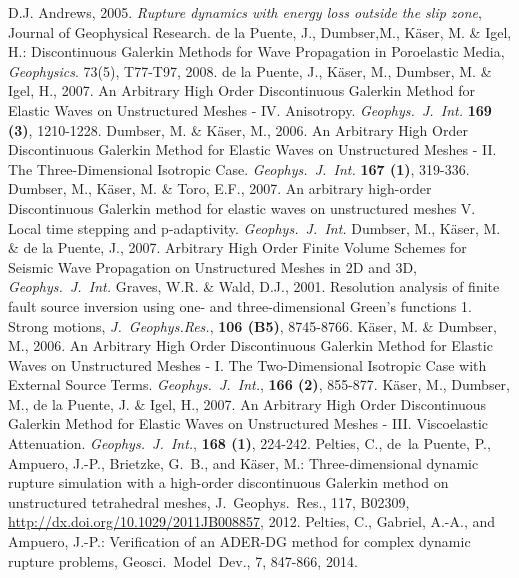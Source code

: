 \documentclass[12pt,twoside]{article}
\begin{document}
\begin{thebibliography}{99}
D.J. Andrews, 2005. \textit{Rupture dynamics with energy loss outside the slip zone}, Journal of Geophysical Research.
  de la Puente, J., Dumbser,M., K\"aser, M. \& Igel, H.: Discontinuous Galerkin Methods for Wave Propagation in Poroelastic Media, \textit{Geophysics}. 73(5), T77-T97, 2008.
  de la Puente, J., K\"aser, M., Dumbser, M. \& Igel, H., 2007. An Arbitrary High Order Discontinuous
  Galerkin Method for Elastic Waves on Unstructured Meshes - IV. Anisotropy.
  \textit{Geophys.~J.~Int.} \textbf{169 (3)}, 1210-1228.
  Dumbser, M. \& K\"aser, M., 2006. An Arbitrary High Order Discontinuous Galerkin Method for
  Elastic Waves on Unstructured Meshes - II. The Three-Dimensional Isotropic Case.
  \textit{Geophys.~J.~Int.} \textbf{167 (1)}, 319-336.
  Dumbser, M., K\"aser, M. \& Toro, E.F., 2007. An arbitrary high-order Discontinuous Galerkin method for elastic
  waves on unstructured meshes  V. Local time stepping and p-adaptivity.
  \textit{Geophys.~J.~Int.}
  Dumbser, M., K\"aser, M. \& de la Puente, J., 2007. Arbitrary High Order Finite Volume Schemes for Seismic Wave Propagation on
  Unstructured Meshes in 2D and 3D,
  \textit{Geophys.~J.~Int.}
  Graves, W.R. \& Wald, D.J., 2001. Resolution analysis of finite fault source inversion using one- and three-dimensional Green's functions    1. Strong motions,
  \textit{J.~Geophys.Res.}, \textbf{106 (B5)}, 8745-8766.
  K\"aser, M. \& Dumbser, M., 2006. An Arbitrary High Order Discontinuous Galerkin Method for
  Elastic Waves on Unstructured Meshes - I. The Two-Dimensional Isotropic Case with External Source Terms.
  \textit{Geophys.~J.~Int.}, \textbf{166 (2)}, 855-877.
  K\"aser, M., Dumbser, M., de la Puente, J. \& Igel, H., 2007. An Arbitrary High Order Discontinuous
  Galerkin Method for Elastic Waves on Unstructured Meshes - III. Viscoelastic Attenuation.
  \textit{Geophys.~J.~Int.}, \textbf{168 (1)}, 224-242.
  Pelties, C., de~la Puente, P., Ampuero, J.-P., Brietzke, G.~B., and K\"aser,
  M.: Three-dimensional dynamic rupture simulation with a high-order
  discontinuous {G}alerkin method on unstructured tetrahedral meshes,
  J.~Geophys.~Res., 117, B02309,
  \url{http://dx.doi.org/10.1029/2011JB008857}, 2012.
  Pelties, C., Gabriel, A.-A., and  Ampuero, J.-P.:
  Verification of an ADER-DG method for complex dynamic rupture problems,
  Geosci.~Model~Dev., 7, 847-866, 2014.
\end{thebibliography}
\end{document}

